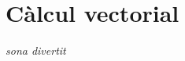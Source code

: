 \documentclass[../calcul-en-diverses-variables.tex]{subfiles}
\begin{document}
\chapter{Càlcul vectorial}
    \emph{sona divertit}
\end{document}
